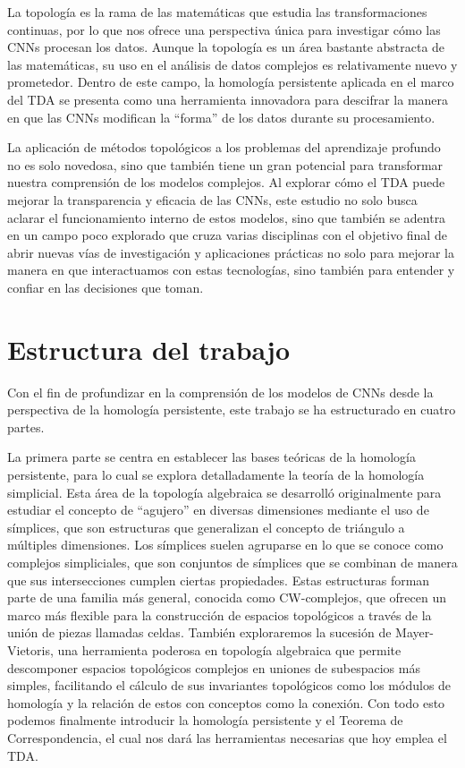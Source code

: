 La topología es la rama de las matemáticas que estudia las transformaciones
continuas, por lo que nos ofrece una perspectiva única para investigar cómo las CNNs
procesan los datos. Aunque la topología es un área bastante abstracta de las
matemáticas, su uso en el análisis de datos complejos es relativamente nuevo y prometedor.
Dentro de este campo, la homología persistente aplicada en el marco del TDA se presenta
como una herramienta innovadora para descifrar la manera en que las CNNs modifican
la \enquote{forma} de los datos durante su procesamiento.

La aplicación de métodos topológicos a los problemas del aprendizaje profundo no
es solo novedosa, sino que también tiene un gran potencial para transformar nuestra
comprensión de los modelos complejos. Al explorar cómo el TDA puede mejorar la
transparencia y eficacia de las CNNs, este estudio no solo busca aclarar el funcionamiento
interno de estos modelos, sino que también se adentra en un campo poco explorado
que cruza varias disciplinas con el objetivo final de abrir nuevas vías de
investigación y aplicaciones prácticas no solo para mejorar la manera en que
interactuamos con estas tecnologías, sino también para entender y confiar en las
decisiones que toman.

\section{Estructura del trabajo}

Con el fin de profundizar en la comprensión de los modelos de CNNs desde la
perspectiva de la homología persistente, este trabajo se ha estructurado en cuatro
partes.

La primera parte se centra en establecer las bases teóricas de la homología persistente,
para lo cual se explora detalladamente la teoría de la homología simplicial. Esta
área de la topología algebraica se desarrolló originalmente para estudiar el concepto
de \enquote{agujero} en diversas dimensiones mediante el uso de símplices, que son
estructuras que generalizan el concepto de triángulo a múltiples dimensiones.
Los símplices suelen agruparse en lo que se conoce como complejos simpliciales, que
son conjuntos de símplices que se combinan de manera que sus intersecciones cumplen
ciertas propiedades. Estas estructuras forman parte de una familia más general, conocida
como CW-complejos, que ofrecen un marco más flexible para la construcción de
espacios topológicos a través de la unión de piezas llamadas celdas. También exploraremos
la sucesión de Mayer-Vietoris, una herramienta poderosa en topología algebraica
que permite descomponer espacios topológicos complejos en uniones de subespacios
más simples, facilitando el cálculo de sus invariantes topológicos como los módulos
de homología y la relación de estos con conceptos como la conexión. Con todo
esto podemos finalmente introducir la homología persistente y el Teorema de
Correspondencia, el cual nos dará las herramientas necesarias que hoy emplea el TDA.

